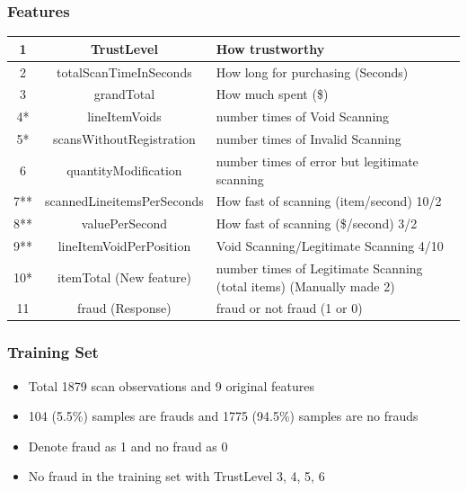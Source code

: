\documentclass{beamer}
\begin{document}
\begin{frame}
\frametitle{Features}
    \small{
\begin{table}[H]
    \centering
    \begin{tabular}{|c|c|p{52mm}|}
    \hline
        1 & TrustLevel & How trustworthy \\ \hline
        2 & totalScanTimeInSeconds & How long for purchasing (Seconds)\\ \hline
        3 & grandTotal & How much spent (\$)\\ \hline
        
        4* & lineItemVoids & number times of Void Scanning \\ \hline 
        5* & scansWithoutRegistration & number times of Invalid Scanning \\ \hline
        6 & quantityModification & number times of error but legitimate scanning  \\ \hline
        7** & scannedLineitemsPerSeconds & How fast of scanning (item/second)   10/2 \\ \hline
        8** & valuePerSecond & How fast of scanning (\$/second)       3/2 \\ \hline
        9** & lineItemVoidPerPosition & Void Scanning/Legitimate Scanning   4/10  \\ \hline
        10* & itemTotal (New feature) & number times of Legitimate Scanning (total items) (Manually made 2\times 7)\\ \hline
        11 & fraud (Response) &   fraud or not fraud (1 or 0) \\ \hline
    \end{tabular}
\end{table}
}
\end{frame}

\begin{frame}
\frametitle{Training Set}
    \begin{itemize}
        \item Total 1879 scan observations and 9 original features
        \item 104 (5.5\%) samples are frauds and 1775 (94.5\%) samples are no frauds
        \item Denote fraud as 1 and no fraud as 0
        \item No fraud in the training set with TrustLevel 3, 4, 5, 6
    \end{itemize}
\end{frame}
\end{document}
